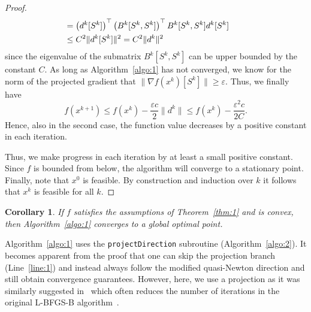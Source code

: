 \documentclass[letterpaper]{article} %
\newtheorem{corollary}[theorem]{Corollary}
\newcommand{\vareps}{\varepsilon}
\newcommand{\ignore}[1]{}
\begin{document}
\begin{proof}
\[\begin{split}
& \hspace{-5ex} = \left(d^k[S^k]\right)^\top \left(B^k[S^k, S^k]\right)^\top B^k[S^k, S^k] d^k[S^k]\\
& \hspace{-5ex} \leq C^2 \|d^k[S^k]\|^2  = C^2 \|d^k\|^2
\end{split}
\]
since the eigenvalue of the submatrix $B^k[S^k, S^k]$ can be upper bounded by the constant $C$. %
As long as Algorithm~\ref{algo:1} has not converged, we know for the norm of the projected gradient that $\|\nabla f(x^k)[S^k]\| \geq \vareps$. Thus, we finally have
\[
f(x^{k+1}) \leq f(x^k) - \frac{\vareps c}{2}\|d^k\| \leq f(x^k) - \frac{\vareps^2 c}{2C}.
\]
Hence, also in the second case, the function value decreases by a positive constant in each iteration.

Thus, we make progress in each iteration by at least a small positive constant. Since $f$ is bounded from below, the algorithm will converge to a stationary point. Finally, note that $x^0$ is feasible. By construction and induction over $k$ it follows that $x^{k}$ is feasible for all $k$.
\end{proof}

\begin{corollary} If $f$ satisfies the assumptions of Theorem~\ref{thm:1} and is convex, then Algorithm~\ref{algo:1} converges to a global optimal point.
\end{corollary}

Algorithm~\ref{algo:1} uses the \texttt{projectDirection} subroutine (Algorithm~\ref{algo:2}). It becomes apparent from the proof that one can skip the projection branch (Line~\ref{line:1}) and instead always follow the modified quasi-Newton direction and still obtain convergence guarantees. However, here, we use a projection as it was similarly suggested in~\cite{MoralesN11} which often reduces the number of iterations in the original L-BFGS-B algorithm~\cite{ByrdLNZ95}. %
\end{document}
